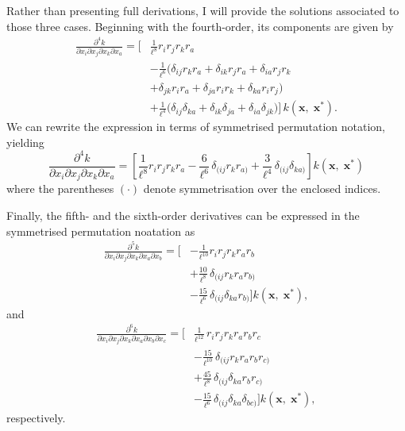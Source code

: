 Rather than presenting full derivations, I will provide the solutions associated to those three cases.
Beginning with the fourth-order, its components are given by
\begin{equation} \label{equ:A.15}
\begin{aligned}
\frac{\partial^4 k}{\partial x_i \partial x_j \partial x_k \partial x_a}
= \Big[ &
\frac{1}{\ell^8} r_i r_j r_k r_a \\
&- \frac{1}{\ell^6} \big(
    \delta_{ij} r_k r_a + \delta_{ik} r_j r_a + \delta_{ia} r_j r_k \\
    &+ \delta_{jk} r_i r_a + \delta_{ja} r_i r_k + \delta_{ka} r_i r_j
\big) \\
&+ \frac{1}{\ell^4} \big(
    \delta_{ij} \delta_{ka} + \delta_{ik} \delta_{ja} + \delta_{ia} \delta_{jk}
\big)
\Big] \, k(\mathbf{x},\;\mathbf{x}^*).
\end{aligned}
\end{equation}
We can rewrite the expression in terms of symmetrised permutation notation, yielding
\begin{equation} \label{equ:A.16}
\boxed{
\frac{\partial^4 k}{\partial x_i \partial x_j \partial x_k \partial x_a}
=
\left[
\frac{1}{\ell^8} r_i r_j r_k r_a
- \frac{6}{\ell^6} \, \delta_{(ij} r_k r_{a)}
+ \frac{3}{\ell^4} \, \delta_{(ij} \delta_{ka)}
\right] k(\mathbf{x},\;\mathbf{x}^*)
}
\end{equation}
where the parentheses $(\cdot)$ denote symmetrisation over the enclosed indices.

Finally, the fifth- and the sixth-order derivatives can be expressed in the symmetrised permutation noatation as 
\begin{equation} \label{equ:A.17}
\boxed{
\begin{aligned}
\frac{\partial^5 k}{\partial x_i \partial x_j \partial x_k \partial x_a \partial x_b}
= \Big[ &
- \frac{1}{\ell^{10}} r_i r_j r_k r_a r_b \\
&+ \frac{10}{\ell^8} \, \delta_{(ij} r_k r_a r_{b)} \\
&- \frac{15}{\ell^6} \, \delta_{(ij} \delta_{ka} r_{b)}
\Bigg] k(\mathbf{x},\;\mathbf{x}^*),
\end{aligned}
}
\end{equation}
and
\begin{equation} 
\boxed{
\begin{aligned}
\frac{\partial^6 k}{\partial x_i \partial x_j \partial x_k \partial x_a \partial x_b \partial x_c}
= \Bigg[ &
\frac{1}{\ell^{12}} \, r_i r_j r_k r_a r_b r_c \\
&- \frac{15}{\ell^{10}} \, \delta_{(ij} r_k r_a r_b r_{c)} \\
&+ \frac{45}{\ell^8} \, \delta_{(ij} \delta_{ka} r_b r_{c)} \\
&- \frac{15}{\ell^6} \, \delta_{(ij} \delta_{ka} \delta_{bc)} 
\Bigg] k(\mathbf{x},\;\mathbf{x}^*),
\end{aligned}
}
\end{equation}
respectively.

